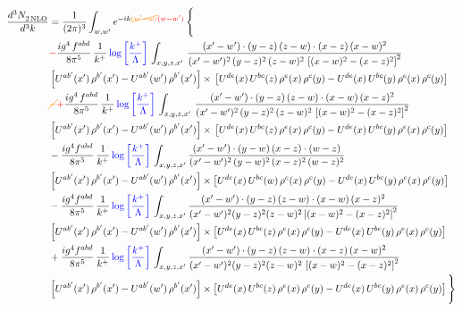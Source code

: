 \documentclass[9pt]{article}
\numberwithin{equation}{section}
\begin{document}
\begin{align}
   \frac{d^{3}N_{2\,\rm NLO}^{\rm}}{d^{3}k}  & = \frac{1}{(2\pi)^{3}}  \int_{w, w^\prime} e^{-ik{\color{orange}\cancel{(w^\prime-w)}}{\color{red}(w-w^\prime)}}\, \Bigg\{\notag \\ &  {\color{red}-}\frac{ig^{4}\, f^{abd}}{8\pi^{5}}\, \frac{1}{k^{+}}\,{\color{blue}\log{\left[\frac{k^{+}}{\Lambda}\right]}}\, \int_{x,y,z,x'}\,\frac{(x'-w')\cdot  (y-z)\, (z-w)\cdot (x-z)\, (x-w)^{2}}{(x'-w')^{2}\, (y-z)^{2}\, (z-w)^{2}\,\left[(x-w)^{2}-(x-z)^{2}\right]^{2}}\, \notag \\ & \left[U^{ab'}(x')\,\rho^{b'}(x')-U^{ab'}(w')\, \rho^{b'}(x')\right]\times\,\left[U^{de}(x)\,U^{bc}(z)\, \rho^{e}(x)\,\rho^{c}(y)-U^{de}(x)\,U^{bc}(y)\,\rho^{e}(x)\,\rho^{c}(y)\right]\notag \\ &   {\color{orange}\cancel{-}}{\color{red}+} \frac{ig^{4}\, f^{abd}}{8\pi^{5}}\, \frac{1}{k^{+}}\,{\color{blue}\log{\left[\frac{k^{+}}{\Lambda}\right]}}\, \int_{x,y,z,x'}\,\frac{(x'-w')\cdot  (y-z)\, (z-w)\cdot (x-w)\, (x-z)^{2}}{(x'-w')^{2}\, (y-z)^{2}\, (z-w)^{2}\,\left[(x-w)^{2}-(x-z)^{2}\right]^{2}}\, \notag \\ & \left[U^{ab'}(x')\,\rho^{b'}(x')-U^{ab'}(w')\, \rho^{b'}(x')\right]\times\,\left[U^{de}(x)\,U^{bc}(z)\, \rho^{e}(x)\,\rho^{c}(y)-U^{de}(x)\,U^{bc}(y)\,\rho^{e}(x)\,\rho^{c}(y)\right]\notag \\ & -\frac{ig^{4}f^{abd}}{8\pi^{5}}\,\frac{1}{k^{+}}\,{\color{blue}\log{\left[\frac{k^{+}}{\Lambda}\right]}}\,\int_{x,y,z,x'}
\frac{(x'-w')\cdot (y-w)\, (x-z)\cdot (w-z)}{(x'-w')^{2}\, (y-w)^{2}\, (x-z)^{2}\, (w-z)^{2}}\notag \\ & \left[U^{ab'}(x')\,\rho^{b'}(x')-U^{ab'}(w')\, \rho^{b'}(x')\right]\times \left[U^{de}(x)\,U^{bc}(w)\, \rho^{e}(x)\,\rho^{c}(y)-U^{de}(x)\,U^{bc}(y)\,\rho^{e}(x)\,\rho^{c}(y)\right]\notag \\ & -\frac{ig^{4}f^{abd}}{8\pi^{5}}\,\frac{1}{k^{+}}\,{\color{blue}\log{\left[\frac{k^{+}}{\Lambda}\right]}}\,\int_{x,y,z,x'}
\frac{(x'-w')\cdot(y-z)\,(z-w)\cdot(x-w)\,(x-z)^{2}}{(x'-w')^{2}(y-z)^{2}(z-w)^{2}\left[(x-w)^{2}-(x-z)^{2}\right]^{2}}\notag \\ & \left[U^{ab'}(x')\,\rho^{b'}(x')-U^{ab'}(w')\, \rho^{b'}(x')\right]\times \left[U^{de}(x)\,U^{bc}(z)\, \rho^{e}(x)\,\rho^{c}(y)-U^{de}(x)\,U^{bc}(y)\,\rho^{e}(x)\,\rho^{c}(y)\right]\notag \\ & +\frac{ig^{4}f^{abd}}{8\pi^{5}}\,\frac{1}{k^{+}}\,{\color{blue}\log{\left[\frac{k^{+}}{\Lambda}\right]}}\,\int_{x,y,z,x'}
\frac{(x'-w')\cdot(y-z)\,(z-w)\cdot(x-z)\,(x-w)^{2}}{(x'-w')^{2}(y-z)^{2}(z-w)^{2}\,\left[(x-w)^{2}-(x-z)^{2}\right]^{2}}\notag \\ & \left[U^{ab'}(x')\,\rho^{b'}(x')-U^{ab'}(w')\, \rho^{b'}(x')\right]\times \left[U^{de}(x)\,U^{bc}(z)\, \rho^{e}(x)\,\rho^{c}(y)-U^{de}(x)\,U^{bc}(y)\,\rho^{e}(x)\,\rho^{c}(y)\right]\Bigg\} 
\end{align}   
\end{document}
